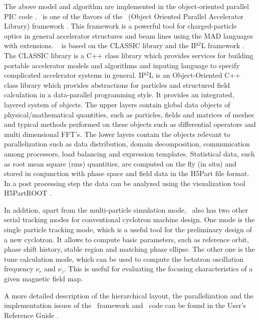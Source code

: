 \documentclass[aps,prstab,onecolumn,superscriptaddress,showpacs]{revtex4}
\begin{document}
The above model and algorithm are implemented in the object-oriented parallel PIC code \opalcycl. 
\opalcycl \  is one of the flavors of the \opal \ (Object Oriented Parallel Accelerator Library) framework \cite{opal:1}. 
This framework is a powerful tool for charged-particle optics in general accelerator structures and beam lines using the MAD languages with extensions.
\opal ~ is  based on the CLASSIC \cite{Classic:1} library and the IP$^2$L framework \cite{ippl:1}. The CLASSIC library is a C++ class library which provides services for building portable accelerator models and algorithms and inputing 
language to specify complicated accelerator systems in general. IP$^2$L is an Object-Oriented C++ class library which provides abstractions for particles and structured field calculation
in a data-parallel programming style. It provides an integrated, layered system of objects. The upper layers
contain global data objects of physical/mathematical quantities, such as particles, fields and matrices of meshes and typical methods
performed on these objects such as differential operators and multi dimensional FFT's. The lower layers contain the objects relevant to parallelization such as data distribution, domain decomposition, communication among processors, load balancing and expression templates. Statistical data, such as root mean square (rms) quantities, are computed on the fly (in situ) and stored in conjunction with phase space and
field data in the H5Part \cite{H5part:1} file format. In a post processing step the data  can be analyzed
using the visualization tool H5PartROOT \cite{h5partroot:1}.

In addition, apart from the multi-particle simulation mode, \opalcycl \  also has two other serial tracking modes for conventional cyclotron machine design. 
One mode is the single particle tracking mode, which is a useful tool for 
the preliminary design of a new cyclotron. It allows to compute  basic parameters, such as reference orbit, phase shift history,
stable region and matching phase ellipse. The other one is the tune calculation mode, which can be used to compute the betatron oscillation frequency 
$\nu_r$ and $\nu_z$. This is useful for evaluating 
the focusing characteristics of a given magnetic field map. 

A more detailed description of the hierarchical layout, the parallelization and the implementation issues of the \opal \  framework and \opalcycl \  code
can be found in the User's Reference Guide \cite{opal:1}.  
\end{document}
